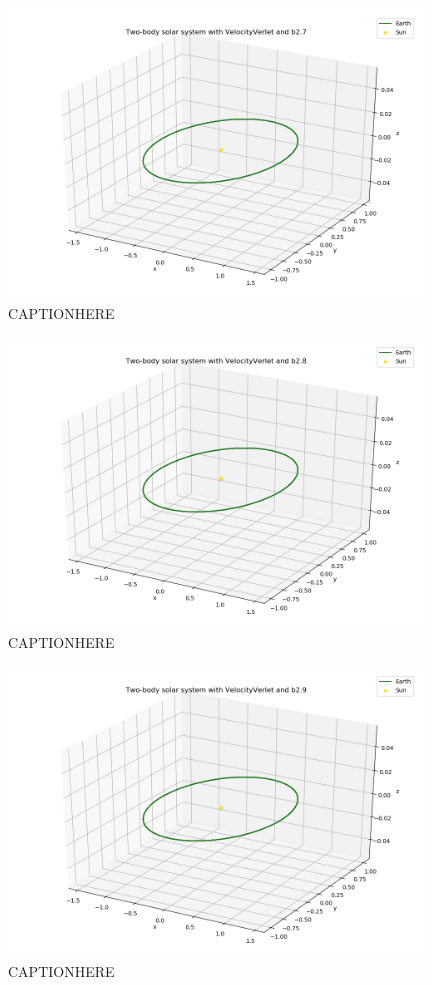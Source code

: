 \documentclass{article}
\begin{document}
    \begin{figure}[H]
        \centering
        \includegraphics[width = 11cm]{img/plot3D_S_E_V_b27.png}
        \caption{CAPTIONHERE}
        \label{fig:plot3D_S_E_V_b27}
    \end{figure}

    \begin{figure}[H]
        \centering
        \includegraphics[width = 11cm]{img/plot3D_S_E_V_b28.png}
        \caption{CAPTIONHERE}
        \label{fig:plot3D_S_E_V_b28}
    \end{figure}

    \begin{figure}[H]
        \centering
        \includegraphics[width = 11cm]{img/plot3D_S_E_V_b29.png}
        \caption{CAPTIONHERE}
        \label{fig:plot3D_S_E_V_b29}
    \end{figure}
\end{document}
